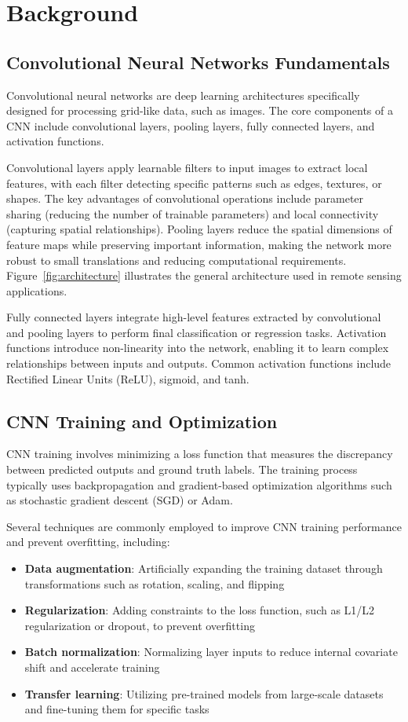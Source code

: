 \documentclass[12pt,a4paper]{article}
\begin{document}
\section{Background}
\label{sec:background}

\subsection{Convolutional Neural Networks Fundamentals}
Convolutional neural networks are deep learning architectures specifically designed for processing grid-like data, such as images. The core components of a CNN include convolutional layers, pooling layers, fully connected layers, and activation functions. 

Convolutional layers apply learnable filters to input images to extract local features, with each filter detecting specific patterns such as edges, textures, or shapes. The key advantages of convolutional operations include parameter sharing (reducing the number of trainable parameters) and local connectivity (capturing spatial relationships). Pooling layers reduce the spatial dimensions of feature maps while preserving important information, making the network more robust to small translations and reducing computational requirements. Figure~\ref{fig:architecture} illustrates the general architecture used in remote sensing applications.

Fully connected layers integrate high-level features extracted by convolutional and pooling layers to perform final classification or regression tasks. Activation functions introduce non-linearity into the network, enabling it to learn complex relationships between inputs and outputs. Common activation functions include Rectified Linear Units (ReLU), sigmoid, and tanh.

\subsection{CNN Training and Optimization}
CNN training involves minimizing a loss function that measures the discrepancy between predicted outputs and ground truth labels. The training process typically uses backpropagation and gradient-based optimization algorithms such as stochastic gradient descent (SGD) or Adam. 

Several techniques are commonly employed to improve CNN training performance and prevent overfitting, including:
\begin{itemize}
\item \textbf{Data augmentation}: Artificially expanding the training dataset through transformations such as rotation, scaling, and flipping
\item \textbf{Regularization}: Adding constraints to the loss function, such as L1/L2 regularization or dropout, to prevent overfitting
\item \textbf{Batch normalization}: Normalizing layer inputs to reduce internal covariate shift and accelerate training
\item \textbf{Transfer learning}: Utilizing pre-trained models from large-scale datasets and fine-tuning them for specific tasks
\end{itemize}
\end{document}
